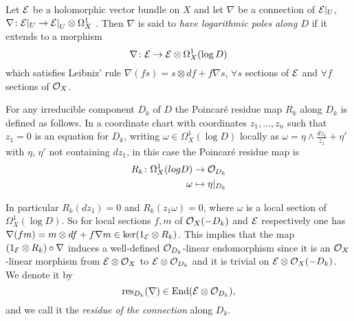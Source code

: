 \documentclass[../main.tex]{subfiles}
\begin{document}
\begin{defn} 
Let $\mathcal{E}$ be a holomorphic vector bundle on $X$ and let $\nabla$ be a connection of $\mathcal{E}|_U$, $\nabla \colon \mathcal{E}|_U \to {\mathcal{E}|}_{U} \otimes \Omega^1_X$ . Then $\nabla$ is said to \emph{have logarithmic poles along $D$} if it extends to a morphism
\[
\nabla \colon \mathcal{E} \to  \mathcal{E}  \otimes \Omega^1_X( \log D)
\]
which satisfies Leibniz’ rule $\nabla(fs) = s \otimes df + f\nabla s $, $\forall s$ sections of $\mathcal{E}$ and $\forall f$ sections of $\mathcal{O}_X$.
\end{defn} 
\begin{defn} 
For any irreducible component $D_k$ of $D$ the Poincaré residue map $R_k$ along $D_k$ is defined as follows. In
a coordinate chart with coordinates $z_1, \dots ,z_n$ such that $z_1 = 0$ is an equation for $D_k$, writing $\omega \in \Omega^1_X( \log D)$ locally as $\omega = \eta \wedge \frac{dz_1}{z_1} + \eta'$ with $\eta$, $\eta'$ not
containing $dz_1$, in this case the Poincaré residue map is
\begin{align*}
    R_k \colon \Omega^1_X(log D) &\to \mathcal{O}_{D_k} \\
     \omega &\mapsto \eta |_{D_k}  
\end{align*}
    \end{defn} 
In particular $R_k(dz_1) = 0$ and $R_k(z_1 \omega) = 0$, where $\omega$ is a local section of $\Omega^1_X(\log D)$. So for local sections $f,m$ of $\mathcal{O}_X(-D_k)$ and $\mathcal{E}$ respectively one has $\nabla(fm) = m \otimes df + f\nabla m \in \ker(1_{\mathcal{E}} \otimes R_k)$. This implies that the map $(1_{\mathcal{E}} \otimes R_k) \circ \nabla$ induces a well-defined $\mathcal{O}_{D_k}$-linear endomorphism since it is an $\mathcal{O}_{X}$-linear morphism from $\mathcal{E} \otimes \mathcal{O}_{X}$ to $\mathcal{E} \otimes \mathcal{O}_{D_k}$ and it is trivial on $\mathcal{E} \otimes \mathcal{O}_{X}(-D_k)$. We denote it by
\[
\operatorname{res}_{D_k}(\nabla) \in \operatorname{End}(\mathcal{E} \otimes \mathcal{O}_{D_k}),
\]
and we call it the \emph{residue of the connection} along $D_k$.
\end{document}
